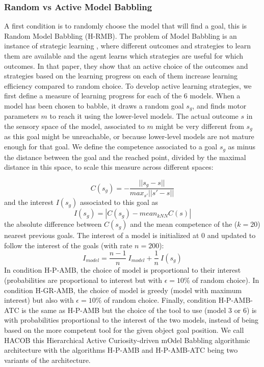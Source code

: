 \documentclass[10pt,letterpaper]{article}
\begin{document}
		
		\subsubsection{Random vs Active Model Babbling}
		
			A first condition is to randomly choose the model that will find a goal, this is Random Model Babbling (H-RMB).
			The problem of Model Babbling is an instance of strategic learning \cite{nguyen2012}, 
			where different outcomes and strategies to learn them are available and the agent learns which strategies are useful for which outcomes.
			In that paper, they show that an active choice of the outcomes and strategies based on the learning progress on each of them increase learning efficiency compared to random choice.
			To develop active learning strategies, we first define a measure of learning progress for each of the $6$ models.
			When a model has been chosen to babble, it draws a random goal $s_g$, and finds motor parameters $m$ to reach it using the lower-level models.
			The actual outcome $s$ in the sensory space of the model, associated to $m$ might be very different from $s_g$ as this goal might be unreachable, or because lower-level models are not mature enough for that goal.
			We define the competence associated to a goal $s_g$ as minus the distance between the goal and the reached point, divided by the maximal distance in this space, to scale this measure across different spaces:
			
			\begin{equation}
				C(s_g)=-\frac{||s_g-s||}{max_{s'}||s'-s||}
			\end{equation}
			 and the interest $I(s_g)$ associated to this goal as 
			\begin{equation}
				I(s_g) = |C(s_g) - mean_{kNN}C(s)|
			\end{equation}
			the absolute difference between $C(s_g)$ and the mean competence of the ($k=20$) nearest previous goals.
			The interest of a model is initialized at $0$ and updated to follow the interest of the goals (with rate $n=200$):
			\begin{equation}
				I_{model}=\frac{n-1}{n}~I_{model} + \frac{1}{n}~I(s_g)
			\end{equation}
			In condition H-P-AMB, the choice of model is proportional to their interest (probabilities are proportional to interest but with $\epsilon=10\%$ of random choice). 
			In condition H-GR-AMB, the choice of model is greedy (model with maximum interest) but also with $\epsilon=10\%$ of random choice.
			Finally, condition H-P-AMB-ATC is the same as H-P-AMB but the choice of the tool to use (model $3$ or $6$) is with probabilities proportional to the interest of the two models, 
			instead of being based on the more competent tool for the given object goal position.
			We call HACOB this Hierarchical Active Curiosity-driven mOdel Babbling algorithmic architecture with the algorithms H-P-AMB and H-P-AMB-ATC being two variants of the architecture.
\end{document}
